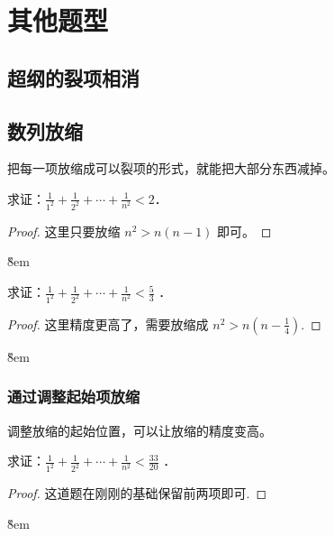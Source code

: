 \section{其他题型}

\subsection{超纲的裂项相消}

\subsection{数列放缩}

\begin{definition}[数列放缩]
    把每一项放缩成可以裂项的形式，就能把大部分东西减掉。
\end{definition}

\begin{example}
    求证：$\frac{1}{1^2}+\frac{1}{2^2}+\cdots+\frac{1}{n^2}<2$．
\end{example}

\begin{proof}
    这里只要放缩 $n^2 > n(n-1)$ 即可。
\end{proof}

\v{8em}

\begin{example}
    求证：$\frac{1}{1^2}+\frac{1}{2^2}+\cdots+\frac{1}{n^2}<\frac{5}{3}$ ．
\end{example}

\begin{proof}
    这里精度更高了，需要放缩成 $n^2 > n(n-\frac{1}{4})$.
\end{proof}

\v{8em}

\subsubsection{通过调整起始项放缩}

调整放缩的起始位置，可以让放缩的精度变高。

\begin{example}
    求证：$\frac{1}{1^2}+\frac{1}{2^2}+\cdots+\frac{1}{n^2}<\frac{33}{20}$ ．
\end{example}

\begin{proof}
    这道题在刚刚的基础保留前两项即可.
\end{proof}

\v{8em}

